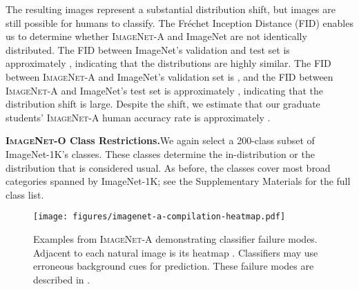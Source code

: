 \documentclass[10pt,twocolumn,letterpaper]{article}
\begin{document}
The resulting images represent a substantial distribution shift, but images are still possible for humans to classify. The Fr\'echet Inception Distance (FID) \cite{Heusel2017GANsTB} enables us to determine whether \textsc{ImageNet-A} and ImageNet are not identically distributed. The FID between ImageNet’s validation and test set is approximately , indicating that the distributions are highly similar. The FID between \textsc{ImageNet-A} and ImageNet’s validation set is , and the FID between \textsc{ImageNet-A} and ImageNet's test set is approximately , indicating that the distribution shift is large. Despite the shift, we estimate that our graduate students' \textsc{ImageNet-A} human accuracy rate is approximately .

\noindent\textbf{\textsc{ImageNet-O} Class Restrictions.}\quad We again select a 200-class subset of ImageNet-1K's  classes. These  classes determine the in-distribution or the distribution that is considered usual. As before, the  classes cover most broad categories spanned by ImageNet-1K; see the Supplementary Materials for the full class list. 

\begin{figure*}[t]
\vspace{-25pt}
\centering
\texttt{[image: figures/imagenet-a-compilation-heatmap.pdf]}
\caption{
Examples from \textsc{ImageNet-A} demonstrating classifier failure modes. Adjacent to each natural image is its heatmap \cite{Selvaraju2019GradCAMVE}. Classifiers may use erroneous background cues for prediction. These failure modes are described in .
}\label{fig:compilation}
\vspace{-10pt}
\end{figure*}
\end{document}
